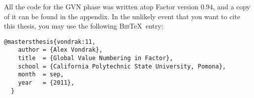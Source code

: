All the code for the \gls{GVN} phase was written atop Factor version $0.94$,
and a copy of it can be found in the appendix.  In the unlikely event
that you want to cite this thesis, you may use the following
\textsc{Bib}\TeX~entry:
\begin{Verbatim}[gobble=2,frame=single]
  @mastersthesis{vondrak:11,
    author = {Alex Vondrak},
    title  = {Global Value Numbering in Factor},
    school = {California Polytechnic State University, Pomona},
    month  = sep,
    year   = {2011},
  }
\end{Verbatim}

